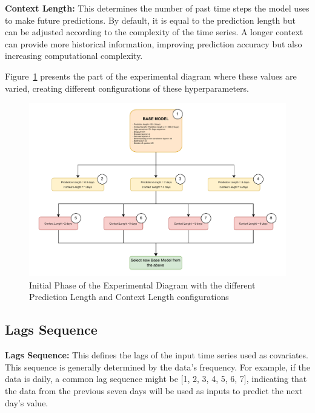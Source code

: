 \vspace{10pt}

\noindent\textbf{Context Length:} This determines the number of past time steps the model uses to make future predictions. By default, it is equal to the prediction length but can be adjusted according to the complexity of the time series. A longer context can provide more historical information, improving prediction accuracy but also increasing computational complexity.

Figure~\ref{D1} presents the part of the experimental diagram where these values are varied, creating different configurations of these hyperparameters.

\begin{figure}[htbp]
    \centering
    \includegraphics[width=15 cm]{5_ChapterDesign/figuras/Diagrams/D1.pdf}
    \caption{Initial Phase of the Experimental Diagram with the different Prediction Length and Context Length configurations}
    \label{D1}
\end{figure}



\subsection{Lags Sequence}

\textbf{Lags Sequence:} This defines the lags of the input time series used as covariates. This sequence is generally determined by the data's frequency. For example, if the data is daily, a common lag sequence might be [1, 2, 3, 4, 5, 6, 7], indicating that the data from the previous seven days will be used as inputs to predict the next day's value.

